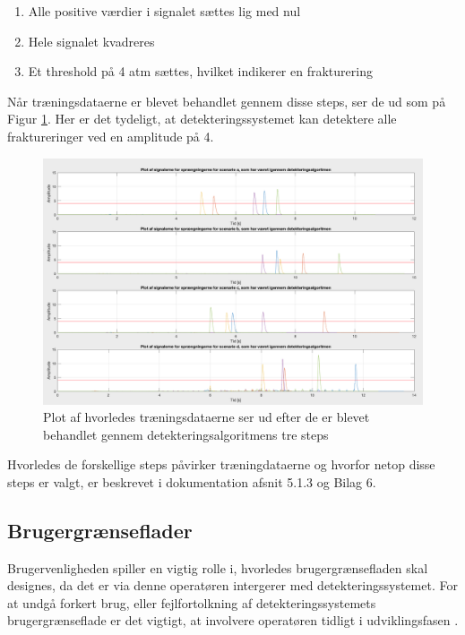 \begin{enumerate}
	\item Alle positive værdier i signalet sættes lig med nul 
	\item Hele signalet kvadreres 
	\item Et threshold på 4 atm sættes, hvilket indikerer en frakturering
\end{enumerate}  

Når træningsdataerne er blevet behandlet gennem disse steps, ser de ud som på Figur \ref{detektering}. Her er det tydeligt, at detekteringssystemet kan detektere alle fraktureringer ved en amplitude på 4. 

\begin{figure}[H]
	\centering
	\includegraphics[width=1\textwidth]{Figure/detekteret}
	\caption{Plot af hvorledes træningsdataerne ser ud efter de er blevet behandlet gennem detekteringsalgoritmens tre steps}
    \label{detektering}
\end{figure} 

Hvorledes de forskellige steps påvirker træningdataerne og hvorfor netop disse steps er valgt, er beskrevet i dokumentation afsnit 5.1.3 og Bilag 6.  

\subsection{Brugergrænseflader}
Brugervenligheden spiller en vigtig rolle i, hvorledes brugergrænsefladen skal designes, da det er via denne operatøren intergerer med detekteringssystemet. For at undgå forkert brug, eller fejlfortolkning af detekteringssystemets brugergrænseflade er det vigtigt, at involvere operatøren tidligt i udviklingsfasen \cite{standard1}. 

